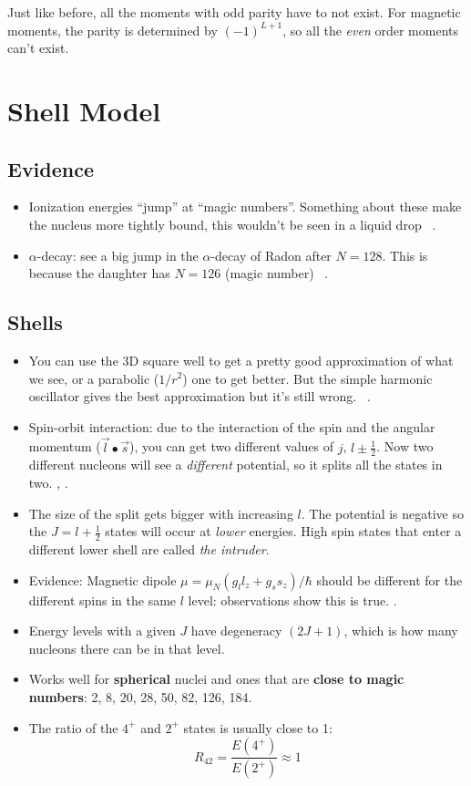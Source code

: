 \documentclass[letter]{article}
\begin{document}
Just like before, all the moments with odd parity have to not
exist. For magnetic moments, the parity is determined by $(-1)^{L+1}$,
so all the \textit{even} order moments can't exist.

\section{Shell Model}

\subsection{Evidence}
\begin{itemize}
\item Ionization energies ``jump'' at ``magic numbers''. Something about these make the nucleus more tightly
  bound, this wouldn't be seen in a liquid
  drop ~\cite[Lec. 12]{lecture}.
\item $\alpha$-decay: see a big jump in the $\alpha$-decay of Radon
  after $N=128$. This is because the daughter has $N=126$ (magic
  number) ~\cite[Lec. 12]{lecture}.
\end{itemize}

\subsection{Shells}
\begin{itemize}
\item You can use the 3D square well to get a pretty good
  approximation of what we see, or a parabolic ($1/r^2$) one to get
  better. But the simple harmonic oscillator gives the best
  approximation but it's still wrong. ~\cite[Lec. 12]{lecture}.
\item Spin-orbit interaction: due to the interaction of the spin and
  the angular momentum ($\vec{l}\bullet\vec{s}$), you can get two
  different values of $j$, $l \pm \frac{1}{2}$. Now two different
  nucleons will see a \textit{different} potential, so it splits all
  the states in two. \cite[Lec. 13-16]{lecture},
  \cite[pp. 123-125]{krane}.
\item The size of the split gets bigger with increasing $l$. The
  potential is negative so the $J=l+\frac{1}{2}$ states will occur at
  \textit{lower} energies. High spin states that enter a different lower shell are called \textit{the
  intruder}. \cite[Lec. 13-16]{lecture}
\item Evidence: Magnetic dipole $\mu=\mu_N(g_ll_z + g_ss_z)/\hbar$
  should be different for the different spins in the same $l$
  level: observations show this is true. \cite[Lec. 13-16]{lecture}.
\item Energy levels with a given $J$ have degeneracy $(2J+1)$, which
  is how many nucleons there can be in that level.
\item Works well for \textbf{spherical} nuclei and ones that are
  \textbf{close to magic numbers}: 2, 8, 20, 28, 50, 82, 126, 184.
\item The ratio of the $4^+$ and $2^+$ states is usually close to 1:
  \begin{equation*}
    R_{42}=\frac{E(4^+)}{E(2^+)} \approx 1
  \end{equation*}
\end{itemize}
\end{document}
